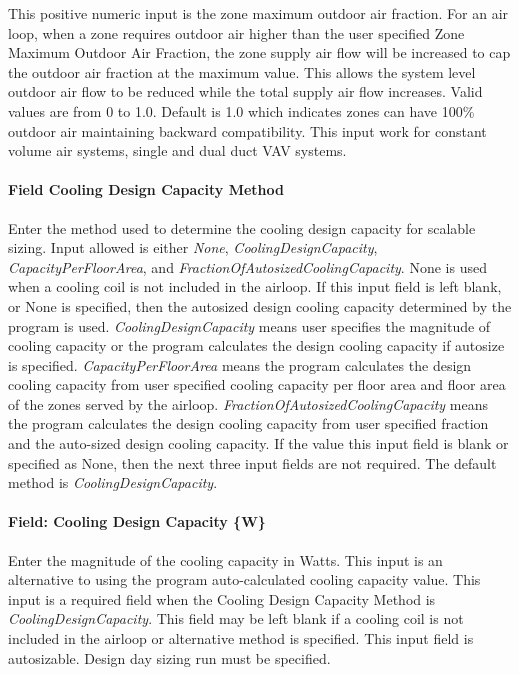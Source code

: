 This positive numeric input is the zone maximum outdoor air fraction. For an air loop, when a zone requires outdoor air higher than the user specified Zone Maximum Outdoor Air Fraction, the zone supply air flow will be increased to cap the outdoor air fraction at the maximum value. This allows the system level outdoor air flow to be reduced while the total supply air flow increases. Valid values are from 0 to 1.0. Default is 1.0 which indicates zones can have 100\% outdoor air maintaining backward compatibility. This input work for constant volume air systems, single and dual duct VAV systems.

\paragraph{Field Cooling Design Capacity Method}\label{field-cooling-design-capacity-method-1}

Enter the method used to determine the cooling design capacity for scalable sizing. Input allowed is either \emph{None}, \emph{CoolingDesignCapacity}, \emph{CapacityPerFloorArea}, and \emph{FractionOfAutosizedCoolingCapacity}. None is used when a cooling coil is not included in the airloop. If this input field is left blank, or None is specified, then the autosized design cooling capacity determined by the program is used. \emph{CoolingDesignCapacity} means user specifies the magnitude of cooling capacity or the program calculates the design cooling capacity if autosize is specified. \emph{CapacityPerFloorArea} means the program calculates the design cooling capacity from user specified cooling capacity per floor area and floor area of the zones served by the airloop. \emph{FractionOfAutosizedCoolingCapacity} means the program calculates the design cooling capacity from user specified fraction and the auto-sized design cooling capacity. If the value this input field is blank or specified as None, then the next three input fields are not required. The default method is \emph{CoolingDesignCapacity}.

\paragraph{Field: Cooling Design Capacity \{W\}}\label{field-cooling-design-capacity-w-1}

Enter the magnitude of the cooling capacity in Watts. This input is an alternative to using the program auto-calculated cooling capacity value. This input is a required field when the Cooling Design Capacity Method is \emph{CoolingDesignCapacity}. This field may be left blank if a cooling coil is not included in the airloop or alternative method is specified. This input field is autosizable. Design day sizing run must be specified.

